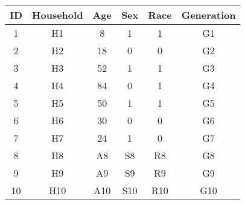 \begin{tabular}{cccccc}
ID & Household & Age & Sex & Race & Generation \\
\hline
\hline
1 & H1 & 8 & 1 & 1 & G1  \\
\hline
2 & H2 & 18 & 0 & 0 & G2  \\
\hline
3 & H3 & 52 & 1 & 1 & G3  \\
\hline
4 & H4 & 84 & 0 & 1 & G4  \\
\hline
5 & H5 & 50 & 1 & 1 & G5  \\
\hline
6 & H6 & 30 & 0 & 0 & G6  \\
\hline
7 & H7 & 24 & 1 & 0 & G7  \\
\hline
8 & H8 & A8 & S8 & R8 & G8  \\
\hline
9 & H9 & A9 & S9 & R9 & G9  \\
\hline
10 & H10 & A10 & S10 & R10 & G10  \\
\hline
\end{tabular}
